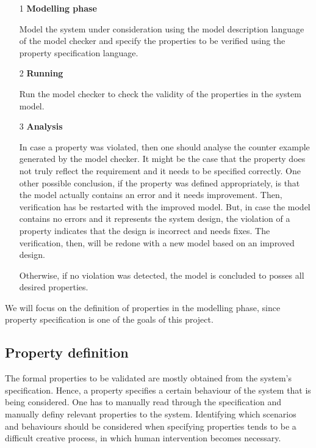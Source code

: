 \begin{itemize}

\item[1] \textbf{Modelling phase}

	Model the system under consideration using the model description language of the model checker and specify the properties to be verified using the property specification language.

\item[2] \textbf{Running}

	Run the model checker to check the validity of the properties in the system model.

\item[3] \textbf{Analysis}

In case a property was violated, then one should analyse the counter example generated by the model checker. It might be the case that the property does not truly reflect the requirement and it needs to be specified correctly. One other possible conclusion, if the property was defined appropriately, is that the model actually contains an  error and it needs improvement. Then, verification has be restarted with the improved model. But, in case the model contains no errors and it represents the system design, the violation of a property indicates that the design is incorrect and needs fixes. The verification, then, will be redone with a new model based on an improved design.
	
Otherwise, if no violation was detected, the model is concluded to posses all desired properties.

\end{itemize}

We will focus on the definition of properties in the modelling phase, since property specification is one of the goals of this project.

\subsection{Property definition}

The formal properties to be validated are mostly obtained from the system's specification\cite{Baier}. Hence, a property specifies a certain behaviour of the system that is being considered. One has to manually read through the specification and manually definy relevant properties to the system. Identifying which scenarios and behaviours should be considered when specifying properties tends to be a difficult creative process, in which human intervention becomes necessary. 

